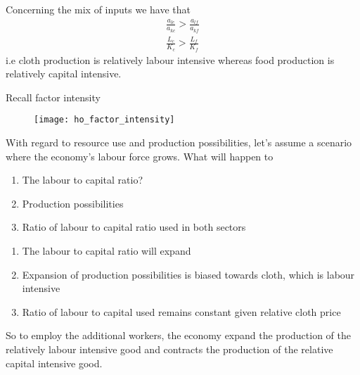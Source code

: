 \documentclass{beamer}
\begin{document}
\begin{frame}
  Concerning the mix of inputs we have that
  \begin{align*}
    \frac{a_{lc}}{a_{kc}} > \frac{a_{lf}}{a_{kf}}\\
    \frac{L_c}{K_c} > \frac{L_f}{K_f}
  \end{align*}
  i.e cloth production is relatively labour intensive whereas food production is relatively capital intensive.
\end{frame}

\begin{frame}{Recall factor intensity}
  \begin{figure}
    \texttt{[image: ho\_factor\_intensity]}
  \end{figure}
\end{frame}

\begin{frame}
  With regard to resource use and production possibilities, let's assume a scenario where the economy's labour force grows.
  What will happen to
  \begin{enumerate}
    \item The labour to capital ratio?
    \item Production possibilities
    \item Ratio of labour to capital ratio used in both sectors
  \end{enumerate}
\end{frame}

\begin{frame}
  \begin{enumerate}
    \item The labour to capital ratio will expand
    \item Expansion of production possibilities is biased towards cloth, which is labour intensive
    \item Ratio of labour to capital used remains constant given relative cloth price
  \end{enumerate}
  So to employ the additional workers, the economy expand the production of the relatively labour intensive good and contracts the production of the relative capital intensive good.
\end{frame}
\end{document}
